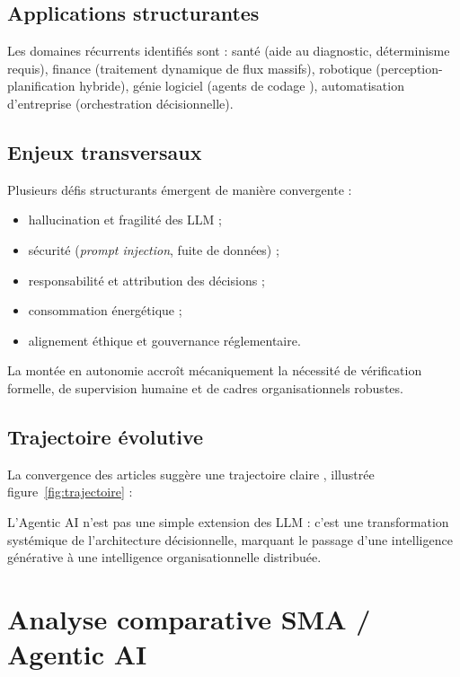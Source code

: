 \subsection{Applications structurantes}

Les domaines récurrents identifiés sont : santé (aide au diagnostic, déterminisme requis), finance (traitement dynamique de flux massifs), robotique (perception-planification hybride), génie logiciel (agents de codage \cite{tosem2025}), automatisation d'entreprise (orchestration décisionnelle).

\subsection{Enjeux transversaux}

Plusieurs défis structurants émergent de manière convergente \cite{patel2025,pati2025,vaidhyanathan_taibi} :

\begin{itemize}[leftmargin=1cm]
\item hallucination et fragilité des LLM ;
\item sécurité (\emph{prompt injection}, fuite de données) ;
\item responsabilité et attribution des décisions ;
\item consommation énergétique ;
\item alignement éthique et gouvernance réglementaire.
\end{itemize}

La montée en autonomie accroît mécaniquement la nécessité de vérification formelle, de supervision humaine et de cadres organisationnels robustes.

\subsection{Trajectoire évolutive}

La convergence des articles suggère une trajectoire claire \cite{schneider2025,milosevic_rabhi}, illustrée figure~\ref{fig:trajectoire} :



L'Agentic AI n'est pas une simple extension des LLM : c'est une transformation systémique de l'architecture décisionnelle, marquant le passage d'une intelligence générative à une intelligence organisationnelle distribuée.

\section{Analyse comparative SMA / Agentic AI}
\label{sec:compare}

